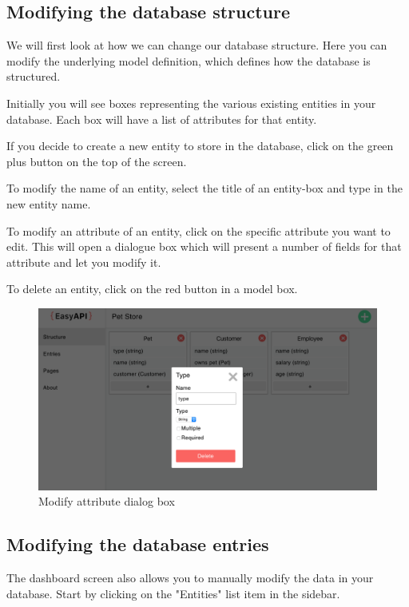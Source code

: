 \subsection{Modifying the database structure}

We will first look at how we can change our database structure. Here you can modify the underlying model definition, which defines how the database is structured.

Initially you will see boxes representing the various existing entities in your database. Each box will have a list of attributes for that entity.

If you decide to create a new entity to store in the database, click on the green plus button on the top of the screen.

To modify the name of an entity, select the title of an entity-box and type in the new entity name.

To modify an attribute of an entity, click on the specific attribute you want to edit. This will open a dialogue box which will present a number of fields for that attribute and let you modify it.

To delete an entity, click on the red button in a model box.

\begin{figure}
\label{attrimg}
\centerline{\includegraphics[scale=0.4]{screenshots/attr.png}}
\caption{Modify attribute dialog box}
\end{figure}



\subsection{Modifying the database entries}
The dashboard screen also allows you to manually modify the data in your database. Start by clicking on the "Entities" list item in the sidebar.

